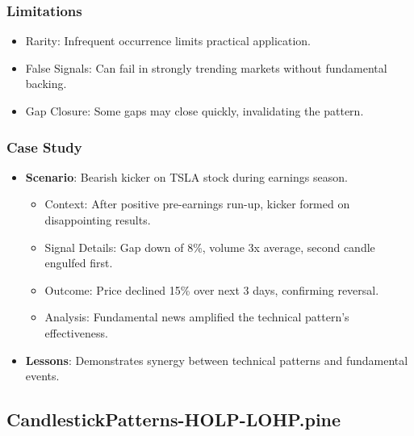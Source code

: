 \documentclass[12pt]{article}
\begin{document}
\subsubsection{Limitations}
\begin{itemize}
\item Rarity: Infrequent occurrence limits practical application.
\item False Signals: Can fail in strongly trending markets without fundamental backing.
\item Gap Closure: Some gaps may close quickly, invalidating the pattern.
\end{itemize}

\subsubsection{Case Study}
\begin{itemize}
\item \textbf{Scenario}: Bearish kicker on TSLA stock during earnings season.
  \begin{itemize}
  \item Context: After positive pre-earnings run-up, kicker formed on disappointing results.
  \item Signal Details: Gap down of 8\%, volume 3x average, second candle engulfed first.
  \item Outcome: Price declined 15\% over next 3 days, confirming reversal.
  \item Analysis: Fundamental news amplified the technical pattern's effectiveness.
  \end{itemize}
\item \textbf{Lessons}: Demonstrates synergy between technical patterns and fundamental events.
\end{itemize}

\subsection{CandlestickPatterns-HOLP-LOHP.pine}
\label{subsec:holp_lohp}
\end{document}

